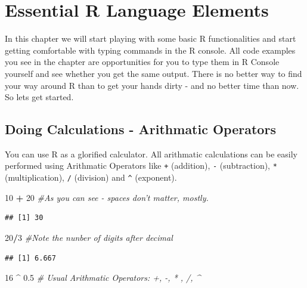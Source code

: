 \documentclass[]{krantz}
\makeatletter
\newenvironment{Shaded}{\begin{snugshade}}{\end{snugshade}}
\newcommand{\DecValTok}[1]{\textcolor[rgb]{0.06,0.06,0.06}{#1}}
\newcommand{\FloatTok}[1]{\textcolor[rgb]{0.06,0.06,0.06}{#1}}
\newcommand{\StringTok}[1]{\textcolor[rgb]{0.5,0.5,0.5}{#1}}
\newcommand{\CommentTok}[1]{\textcolor[rgb]{0.56,0.35,0.01}{\textit{#1}}}
\newcommand{\OperatorTok}[1]{\textcolor[rgb]{0.81,0.36,0.00}{\textbf{#1}}}
\newenvironment{kframe}{%
\medskip{}
\setlength{\fboxsep}{.8em}
 \def\at@end@of@kframe{}%
 \ifinner\ifhmode%
  \def\at@end@of@kframe{\end{minipage}}%
  \begin{minipage}{\columnwidth}%
 \fi\fi%
 \def\FrameCommand##1{\hskip\@totalleftmargin \hskip-\fboxsep
 \colorbox{shadecolor}{##1}\hskip-\fboxsep
     \hskip-\linewidth \hskip-\@totalleftmargin \hskip\columnwidth}%
 \MakeFramed {\advance\hsize-\width
   \@totalleftmargin\z@ \linewidth\hsize
   \@setminipage}}%
 {\par\unskip\endMakeFramed%
 \at@end@of@kframe}
\renewenvironment{Shaded}{\begin{kframe}}{\end{kframe}}
\theoremstyle{definition}
\theoremstyle{definition}
\theoremstyle{definition}
\theoremstyle{remark}
\makeatother
\begin{document}
\chapter{Essential R Language
Elements}\label{essential-r-language-elements}

In this chapter we will start playing with some basic R functionalities
and start getting comfortable with typing commands in the R console. All
code examples you see in the chapter are opportunities for you to type
them in R Console yourself and see whether you get the same output.
There is no better way to find your way around R than to get your hands
dirty - and no better time than now. So lets get started.

\section{Doing Calculations - Arithmatic
Operators}\label{doing-calculations---arithmatic-operators}

You can use R as a glorified calculator. All arithmatic calculations can
be easily performed using Arithmatic Operators like \texttt{+}
(addition), \texttt{-} (subtraction), \texttt{*} (multiplication),
\texttt{/} (division) and \texttt{\^{}} (exponent).

\begin{Shaded}
\begin{Highlighting}[]
\DecValTok{10}  \OperatorTok{+}\StringTok{    }\DecValTok{20}  \CommentTok{#As you can see - spaces don't matter, mostly.}
\end{Highlighting}
\end{Shaded}

\begin{verbatim}
## [1] 30
\end{verbatim}

\begin{Shaded}
\begin{Highlighting}[]
\DecValTok{20}\OperatorTok{/}\DecValTok{3} \CommentTok{#Note the nunber of digits after decimal}
\end{Highlighting}
\end{Shaded}

\begin{verbatim}
## [1] 6.667
\end{verbatim}

\begin{Shaded}
\begin{Highlighting}[]
\DecValTok{16} \OperatorTok{^}\StringTok{ }\FloatTok{0.5}  \CommentTok{# Usual Arithmatic Operators: +, -, * , /, ^}
\end{Highlighting}
\end{Shaded}
\end{document}
